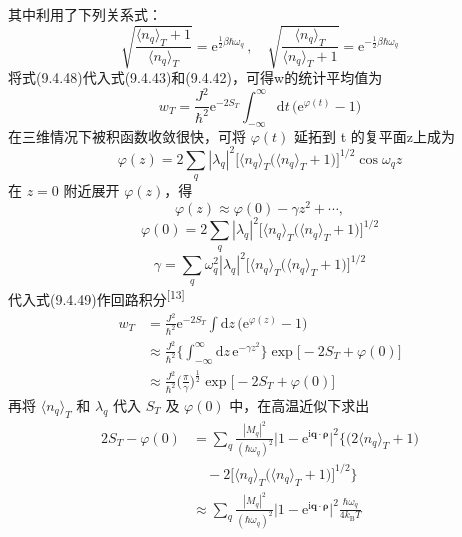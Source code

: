 其中利用了下列关系式：
\begin{equation*}
  \sqrt{\frac{\langle n_{q}\rangle_{T}+1}{\langle n_{q}\rangle_{T}}}
  =\mathrm{e}^{\frac{1}{2}\beta\hbar\omega_{q}}\,,\quad
  \sqrt{\frac{\langle n_{q}\rangle_{T}}{\langle n_{q}\rangle_{T}+1}}
  =\mathrm{e}^{-\frac{1}{2}\beta\hbar\omega_{q}}
\end{equation*}
将式(9.4.48)代入式(9.4.43)和(9.4.42)，可得w的统计平均值为
\begin{equation}
  w_{T}=\frac{J^{2}}{\hbar^{2}}\mathrm{e}^{-2S_{T}}
  \int_{-\infty}^{\infty}\mathrm{d}t\,
  \bigl(\mathrm{e}^{\varphi(t)}-1\bigr)
\end{equation}
在三维情况下被积函数收敛很快，可将 $\varphi(t)$ 延拓到 t 的复平面z上成为
\begin{equation}
  \varphi(z)=2\sum_{q}|\lambda_{q}|^{2}
  \bigl[\langle n_{q}\rangle_{T}
  \bigl(\langle n_{q}\rangle_{T}+1\bigr)\bigr]^{1/2}
  \cos\omega_{q}z
\end{equation}
在 $z=0$ 附近展开 $\varphi(z)$，得
\begin{equation*}
  \varphi(z)\approx\varphi(0)-\gamma z^{2}+\cdots,
\end{equation*}
\begin{equation}
  \varphi(0)=2\sum_{q}|\lambda_{q}|^{2}
  \bigl[\langle n_{q}\rangle_{T}
  \bigl(\langle n_{q}\rangle_{T}+1\bigr)\bigr]^{1/2}
\end{equation}
\begin{equation}
  \gamma=\sum_{q}\omega_{q}^{2}|\lambda_{q}|^{2}
  \bigl[\langle n_{q}\rangle_{T}
  \bigl(\langle n_{q}\rangle_{T}+1\bigr)\bigr]^{1/2}
\end{equation}
代入式(9.4.49)作回路积分\textsuperscript{[13]}
\begin{equation}
\begin{aligned}
  w_{T}&=\frac{J^{2}}{\hbar^{2}}\mathrm{e}^{-2S_{T}}
  \int\mathrm{d}z\,\bigl(\mathrm{e}^{\varphi(z)}-1\bigr)\\
  &\approx\frac{J^{2}}{\hbar^{2}}
  \biggl\{\int_{-\infty}^{\infty}\mathrm{d}z\,\mathrm{e}^{-\gamma z^{2}}
  \biggr\}\exp\bigl[-2S_{T}+\varphi(0)\bigr]\\
  &\approx\frac{J^{2}}{\hbar^{2}}
  \biggl(\frac{\pi}{\gamma}\biggr)^{\frac{1}{2}}
  \exp\bigl[-2S_{T}+\varphi(0)\bigr]
\end{aligned}
\end{equation}
再将 $\langle n_{q}\rangle_{T}$ 和 $\lambda_{q}$ 代入 $S_{T}$ 及 $\varphi(0)$ 中，在高温近似下求出
\begin{equation}
\begin{aligned}
  2S_{T}-\varphi(0)&=\sum_{q}\frac{|M_{q}|^{2}}
  {\left(\hbar\omega_{q}\right)^{2}}
  \bigl|1-\mathrm{e}^{\mathrm{i}\boldsymbol{q}\cdot\boldsymbol{\rho}}\bigr|^{2}
  \bigl\{\bigl(2\langle n_{q}\rangle_{T}+1\bigr)\\
  &\quad-2\bigl[\langle n_{q}\rangle_{T}
  \bigl(\langle n_{q}\rangle_{T}+1\bigr)\bigr]^{1/2}\bigr\}\\
  &\approx\sum_{q}\frac{|M_{q}|^{2}}{\left(\hbar\omega_{q}\right)^{2}}
  \bigl|1-\mathrm{e}^{\mathrm{i}\boldsymbol{q}\cdot\boldsymbol{\rho}}\bigr|^{2}
  \frac{\hbar\omega_{q}}{4k_{\mathrm B}T}
\end{aligned}
\end{equation}
